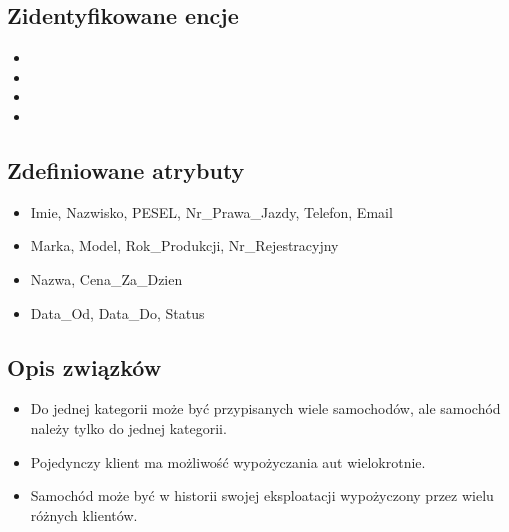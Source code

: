 \documentclass[a4paper,11pt,english,openany,oneside]{sphinxmanual}
\begin{document}
\subsection{Zidentyfikowane encje}
\label{\detokenize{rozdzial_3/index:zidentyfikowane-encje}}\begin{itemize}
\item {} 
\sphinxAtStartPar
{}

\item {} 
\sphinxAtStartPar
{}

\item {} 
\sphinxAtStartPar
{}

\item {} 
\sphinxAtStartPar
{}

\end{itemize}


\subsection{Zdefiniowane atrybuty}
\label{\detokenize{rozdzial_3/index:zdefiniowane-atrybuty}}\begin{itemize}
\item {} 
\sphinxAtStartPar
{} Imie, Nazwisko, PESEL, Nr\_Prawa\_Jazdy, Telefon, Email

\item {} 
\sphinxAtStartPar
{} Marka, Model, Rok\_Produkcji, Nr\_Rejestracyjny

\item {} 
\sphinxAtStartPar
{} Nazwa, Cena\_Za\_Dzien

\item {} 
\sphinxAtStartPar
{} Data\_Od, Data\_Do, Status

\end{itemize}


\subsection{Opis związków}
\label{\detokenize{rozdzial_3/index:opis-zwiazkow}}\begin{itemize}
\item {} 
\sphinxAtStartPar
{} Do jednej kategorii może być przypisanych wiele samochodów, ale samochód należy tylko do jednej kategorii.

\item {} 
\sphinxAtStartPar
{} Pojedynczy klient ma możliwość wypożyczania aut wielokrotnie.

\item {} 
\sphinxAtStartPar
{} Samochód może być w historii swojej eksploatacji wypożyczony przez wielu różnych klientów.

\end{itemize}
\end{document}
